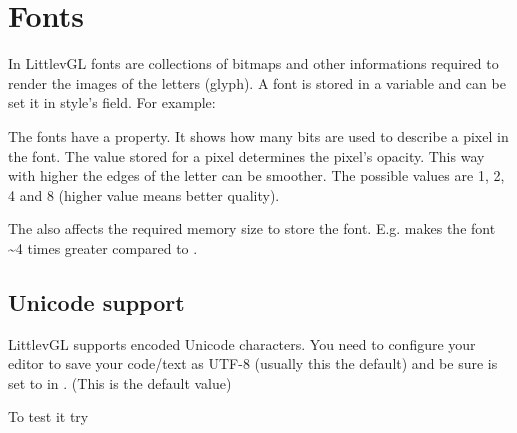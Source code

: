 \documentclass[letterpaper,10pt,english]{sphinxmanual}
\begin{document}
\section{Fonts}
\label{\detokenize{overview/fonts:fonts}}\label{\detokenize{overview/fonts::doc}}
In LittlevGL fonts are collections of bitmaps and other informations required to render the images of the letters (glyph). A font is stored in a  variable and can be set it in style’s  field. For example:

\begin{sphinxVerbatim}[commandchars=\\\{\}]
    
\end{sphinxVerbatim}

The fonts have a  property. It shows how many bits are used to describe a pixel in the font. The value stored for a pixel determines the pixel’s opacity.
This way with higher  the edges of the letter can be smoother. The possible  values are 1, 2, 4 and 8 (higher value means better quality).

The  also affects the required memory size to store the font. E.g.  makes the font \textasciitilde{}4 times greater compared to .


\subsection{Unicode support}
\label{\detokenize{overview/fonts:unicode-support}}
LittlevGL supports  encoded Unicode characters.
You need to configure your editor to save your code/text as UTF-8 (usually this the default) and be sure  is set to  in . (This is the default value)

To test it try

\begin{sphinxVerbatim}[commandchars=\\\{\}]
     
 
\end{sphinxVerbatim}
\end{document}
